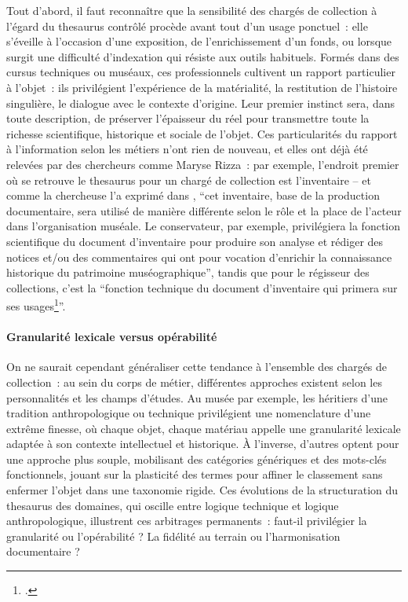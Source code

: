 Tout d'abord, il faut reconnaître que la sensibilité des chargés de collection à l’égard du \gls{thesaurus} contrôlé procède avant tout d'un usage ponctuel~: elle s’éveille à l’occasion d’une exposition, de l'enrichissement d'un fonds, ou lorsque surgit une difficulté d’indexation qui résiste aux outils habituels. Formés dans des cursus techniques ou muséaux, ces professionnels cultivent un rapport particulier à l’objet~: ils privilégient l’expérience de la matérialité, la restitution de l’histoire singulière, le dialogue avec le contexte d’origine. Leur premier instinct sera, dans toute description, de préserver l'épaisseur du réel pour transmettre toute la richesse scientifique, historique et sociale de l'objet. Ces particularités du rapport à l'information selon les métiers n'ont rien de nouveau, et elles ont déjà été relevées par des chercheurs comme Maryse Rizza~: par exemple, l'endroit premier où se retrouve le \gls{thesaurus} pour un chargé de collection est l'inventaire -- et comme la chercheuse l'a exprimé dans \textit{}, \enquote{cet inventaire, base de la production documentaire, sera utilisé de manière différente selon le rôle et la place de l’acteur dans l’organisation muséale. Le conservateur, par exemple, privilégiera la fonction scientifique du document d’inventaire pour produire son analyse et rédiger des notices et/ou des commentaires qui ont pour vocation d’enrichir la connaissance historique du patrimoine muséographique}, tandis que pour le régisseur des collections, c’est la \enquote{fonction technique du document d’inventaire qui primera sur ses usages\footcite{rizzaDocumentAuCoeur2014}}.



\paragraph*{Granularité lexicale versus opérabilité}

On ne saurait cependant généraliser cette tendance à l'ensemble des chargés de collection~: au sein du corps de métier, différentes approches existent selon les personnalités et les champs d'études. Au musée par exemple, les héritiers d’une tradition anthropologique ou technique privilégient une nomenclature d’une extrême finesse, où chaque objet, chaque matériau appelle une granularité lexicale adaptée à son contexte intellectuel et historique. À l’inverse, d’autres optent pour une approche plus souple, mobilisant des catégories génériques et des mots-clés fonctionnels, jouant sur la plasticité des termes pour affiner le classement sans enfermer l’objet dans une taxonomie rigide. Ces évolutions de la structuration du \gls{thesaurus} des domaines, qui oscille entre logique technique et logique anthropologique, illustrent ces arbitrages permanents~: faut-il privilégier la granularité ou l’opérabilité ? La fidélité au terrain ou l’harmonisation documentaire ?


